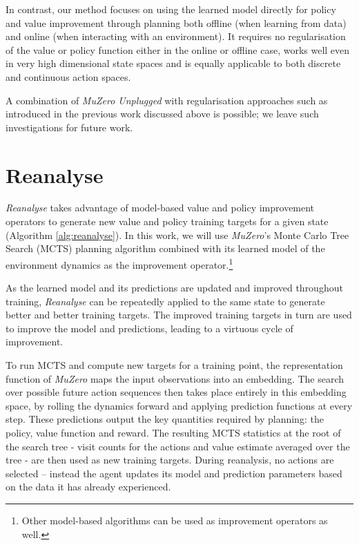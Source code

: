 \documentclass{article}
\newcommand{\muzero}{\emph{MuZero}}
\newcommand{\reanalyse}{\emph{Reanalyse}}
\newcommand{\mzunplugged}{\emph{MuZero Unplugged}}
\begin{document}
In contrast, our method focuses on using the learned model directly for policy and value improvement through planning both offline (when learning from data) and online (when interacting with an environment). It requires no regularisation of the value or policy function either in the online or offline case, works well even in very high dimensional state spaces and is equally applicable to both discrete and continuous action spaces.

A combination of \mzunplugged{} with regularisation approaches such as introduced in the previous work discussed above \cite{kidambi2020morel,yu2020mopo,rafailov2020offline} is possible; we leave such investigations for future work.

\section{Reanalyse}

\reanalyse{} takes advantage of model-based value and policy improvement operators to generate new value and policy training targets for a given state (Algorithm \ref{alg:reanalyse}). In this work, we will use \muzero{}'s Monte Carlo Tree Search (MCTS) planning algorithm combined with its learned model of the environment dynamics as the improvement operator.\footnote{Other model-based algorithms can be used as improvement operators as well.}

As the learned model and its predictions are updated and improved throughout training, \reanalyse{} can be repeatedly applied to the same state to generate better and better training targets. The improved training targets in turn are used to improve the model and predictions, leading to a virtuous cycle of improvement.

\begin{algorithm}[h]
\begin{algorithmic}
    \STATE 
    \STATE 
      \STATE 
      \STATE 
      \STATE 
    \ENDFOR
    \STATE 
    \STATE 
  \ENDFOR

\end{algorithmic}
\caption[]{
\label{alg:reanalyse}
\textbf{The \reanalyse{} algorithm}.
}
\end{algorithm}

To run MCTS and compute new targets for a training point, the representation function of \muzero{} maps the input observations into an embedding. The search over possible future action sequences then takes place entirely in this embedding space, by rolling the dynamics forward and applying prediction functions at every step. These predictions output the key quantities required by planning: the policy, value function and reward. The resulting MCTS statistics at the root of the search tree - visit counts for the actions and value estimate averaged over the tree - are then used as new training targets. During reanalysis, no actions are selected -- instead the agent updates its model and prediction parameters based on the data it has already experienced.
\end{document}
